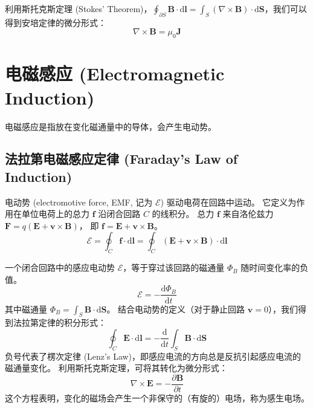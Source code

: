 \documentclass[fontset=none]{ctexart}
\begin{document}
利用斯托克斯定理 (Stokes' Theorem)，$\oint_{\partial S} \bm{B} \cdot \mathrm{d}\bm{l} 
= \int_S (\nabla \times \bm{B}) \cdot \mathrm{d}\bm{S}$，我们可以得到安培定律的微分形式：
\begin{equation}
    \nabla \times \bm{B} = \mu_0 \bm{J}
\end{equation}

\section{电磁感应 (Electromagnetic Induction)}
电磁感应是指放在变化磁通量中的导体，会产生电动势。

\subsection{法拉第电磁感应定律 (Faraday's Law of Induction)}
\begin{definition}[电动势]
    电动势 (electromotive force, EMF, 记为 $\mathcal{E}$) 驱动电荷在回路中运动。
    它定义为作用在单位电荷上的总力 $\bm{f}$ 沿闭合回路 $C$ 的线积分。
    总力 $\bm{f}$ 来自洛伦兹力 $\bm{F} = q(\bm{E} + \bm{v} \times \bm{B})$，
    即 $\bm{f} = \bm{E} + \bm{v} \times \bm{B}$。
    \begin{equation}
        \mathcal{E} = \oint_C \bm{f} \cdot \mathrm{d}\bm{l}
        = \oint_C (\bm{E} + \bm{v} \times \bm{B}) \cdot \mathrm{d}\bm{l}
    \end{equation}
\end{definition}

\begin{law}[法拉第定律]
    一个闭合回路中的感应电动势 $\mathcal{E}$，等于穿过该回路的磁通量 $\Phi_B$ 随时间变化率的负值。
    \begin{equation}
        \mathcal{E} = - \frac{\mathrm{d}\Phi_B}{\mathrm{d}t}
    \end{equation}
    其中磁通量 $\Phi_B = \int_S \bm{B} \cdot \mathrm{d}\bm{S}$。
    结合电动势的定义（对于静止回路 $\bm{v}=0$），我们得到法拉第定律的积分形式：
    \begin{equation}
        \oint_C \bm{E} \cdot \mathrm{d}\bm{l} 
        = - \frac{\mathrm{d}}{\mathrm{d}t} \int_S \bm{B} \cdot \mathrm{d}\bm{S}
    \end{equation}
    负号代表了楞次定律 (Lenz's Law)，即感应电流的方向总是反抗引起感应电流的磁通量变化。
    利用斯托克斯定理，可将其转化为微分形式：
    \begin{equation}
        \nabla \times \bm{E} = - \frac{\partial\bm{B}}{\partial t}
    \end{equation}
    这个方程表明，变化的磁场会产生一个非保守的（有旋的）电场，称为感生电场。
\end{law}
\end{document}
